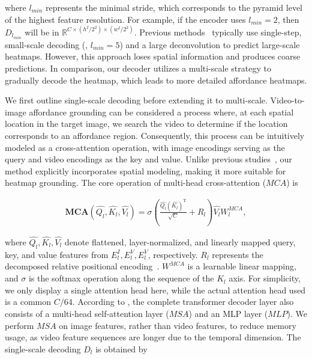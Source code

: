 \documentclass[10pt,twocolumn,letterpaper]{article}
\begin{document}
\noindent where $l_{min}$ represents the minimal stride, which corresponds to the pyramid level of the highest feature resolution. For example, if the encoder uses $l_{min} = 2$, then $D_{l_{min}}$ will be in $\mathbb{R}^{C \times (h^I / 2^2) \times (w^I / 2^2)}$. Previous methods~\cite{demo2vec, hotspot} typically use single-step, small-scale decoding (\eg, $l_{min} = 5$) and a large deconvolution to predict large-scale heatmaps. However, this approach loses spatial information and produces coarse predictions. In comparison, our decoder utilizes a multi-scale strategy to gradually decode the heatmap, which leads to more detailed affordance heatmaps.

We first outline single-scale decoding before extending it to multi-scale. Video-to-image affordance grounding can be considered a process where, at each spatial location in the target image, we search the video to determine if the location corresponds to an affordance region. Consequently, this process can be intuitively modeled as a cross-attention operation, with image encodings serving as the query and video encodings as the key and value. Unlike previous studies~\cite{demo2vec,hotspot}, our method explicitly incorporates spatial modeling, making it more suitable for heatmap grounding. The core operation of multi-head cross-attention ($MCA$) is

\begin{equation}
\begin{aligned}
\boldsymbol{MCA}(\hat{Q_l},\hat{K_l},\hat{V_l}) = \sigma(\frac{\hat{Q_l}(\hat{K_l})^\mathrm{T}}{\sqrt{C}} + R_l)\hat{V_l}W_l^{MCA},
\end{aligned}
\end{equation}

\noindent where $\hat{Q_l},\hat{K_l},\hat{V_l}$ denote flattened, layer-normalized, and linearly mapped query, key, and value features from $E^I_l,E^V_l,E^V_l$, respectively. $R_l$ represents the decomposed relative positional encoding~\cite{vitdet,mvitv2}. $W^{MCA}$ is a learnable linear mapping, and $\sigma$ is the softmax operation along the sequence of the $\hat{K_l}$ axis. For simplicity, we only display a single attention head here, while the actual attention head used is a common $C / 64$. According to \cite{transformer}, the complete transformer decoder layer also consists of a multi-head self-attention layer ($MSA$) and an MLP layer ($MLP$). We perform $MSA$ on image features, rather than video features, to reduce memory usage, as video feature sequences are longer due to the temporal dimension. The single-scale decoding $D_l$ is obtained by
\end{document}
